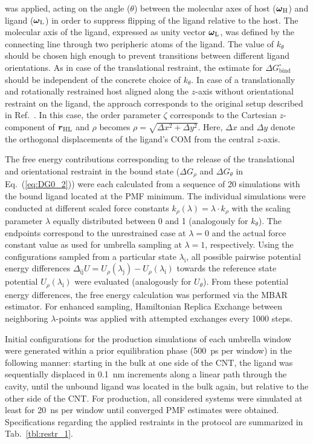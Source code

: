 \documentclass[9pt,lessons,pubversion]{livecoms}
\begin{document}
was applied, acting on the angle ($\theta$) between the molecular axes of host ($\text{\boldmath$\omega$}_\mathrm{H}$) and 
ligand ($\text{\boldmath$\omega$}_\mathrm{L}$) in order to suppress flipping of the ligand relative to the host.
The molecular axis of the ligand, expressed as unity vector $\text{\boldmath$\omega$}_\mathrm{L}$, was defined by the connecting line through two peripheric atoms of the ligand.
The value of $k_\theta$ should be chosen high enough to prevent transitions between different ligand orientations. 
As in case of the translational restraint, the estimate for $\Delta G^\circ_\mathrm{bind}$ should be independent of the concrete choice of $k_\theta$.
In case of a translationally and rotationally restrained host aligned along the $z$-axis without orientational restraint on the ligand, the approach corresponds to the original setup described in Ref.~.
In this case, the order parameter $\zeta$ corresponds to the Cartesian $z$-component of $\text{\boldmath $r$}_\mathrm{HL}$ and $\rho$ becomes $\rho = \sqrt{\Delta x^2 + \Delta y^2}$.
Here, $\Delta x$ and $\Delta y$ denote the orthogonal displacements of the ligand's COM from the central $z$-axis.

The free energy contributions corresponding to the release of the translational and orientational restraint in the bound state ($\Delta G_\rho$ and $\Delta G_\theta$ in Eq.~(\ref{eq:DG0_2})) 
were each calculated from a sequence of 20 simulations with the bound ligand located at the PMF minimum. 
The individual simulations were conducted at different scaled force constants $k_\rho(\lambda) = \lambda \cdot k_\rho$ with the scaling parameter $\lambda$ equally distributed between 0 and 1 (analogously for $k_\theta$).  
The endpoints correspond to the unrestrained case at $\lambda = 0$ and the actual force constant value as used for umbrella sampling at $\lambda = 1$, respectively.
Using the configurations sampled from a particular state $\lambda_\mathrm{i}$, all possible pairwise potential energy differences $\Delta_\mathrm{ij} U = U_\rho(\lambda_\mathrm{j}) - U_\rho(\lambda_\mathrm{i})$ 
towards the reference state potential $U_\rho(\lambda_\mathrm{i})$ were evaluated (analogously for $U_\theta$). 
From these potential energy differences, the free energy calculation was performed via the MBAR estimator. 
For enhanced sampling, Hamiltonian Replica Exchange between neighboring $\lambda$-points was applied with attempted exchanges every 1000 steps. 

Initial configurations for the production simulations of each umbrella window were generated within a prior equilibration phase (500~ps per window) in the following manner:
starting in the bulk at one side of the CNT, the ligand was sequentially displaced in 0.1~nm increments 
along a linear path through the cavity, until the unbound ligand was located in the bulk again, but relative to the other side of the CNT.
For production, all considered systems were simulated at least for 20~ns per window until converged PMF estimates were obtained.
Specifications regarding the applied restraints in the protocol are summarized in Tab.~\ref{tbl:restr_1}.
\end{document}

